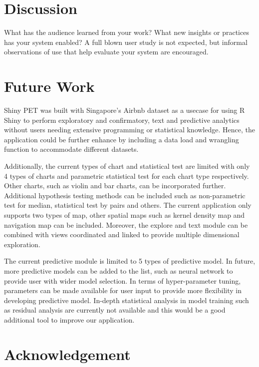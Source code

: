 \documentclass{acm_proc_article-sp}
\begin{document}
\hypertarget{discussion}{%
\section{Discussion}\label{discussion}}

What has the audience learned from your work? What new insights or
practices has your system enabled? A full blown user study is not
expected, but informal observations of use that help evaluate your
system are encouraged.

\hypertarget{future-work}{%
\section{Future Work}\label{future-work}}

Shiny PET was built with Singapore's Airbnb dataset as a usecase for
using R Shiny to perform exploratory and confirmatory, text and
predictive analytics without users needing extensive programming or
statistical knowledge. Hence, the application could be further enhance
by including a data load and wrangling function to accommodate different
datasets.

Additionally, the current types of chart and statistical test are
limited with only 4 types of charts and parametric statistical test for
each chart type respectively. Other charts, such as violin and bar
charts, can be incorporated further. Additional hypothesis testing
methods can be included such as non-parametric test for median,
statistical test by pairs and others. The current application only
supports two types of map, other spatial maps such as kernel density map
and navigation map can be included. Moreover, the explore and text
module can be combined with views coordinated and linked to provide
multiple dimensional exploration.

The current predictive module is limited to 5 types of predictive model.
In future, more predictive models can be added to the list, such as
neural network to provide user with wider model selection. In terms of
hyper-parameter tuning, parameters can be made available for user input
to provide more flexibility in developing predictive model. In-depth
statistical analysis in model training such as residual analysis are
currently not available and this would be a good additional tool to
improve our application.

\hypertarget{acknowledgement}{%
\section{Acknowledgement}\label{acknowledgement}}
\end{document}
